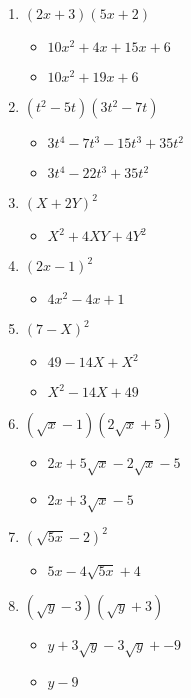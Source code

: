 \documentclass{article}
\begin{document}
\begin{onehalfspace}
\begin{enumerate}
    \item $(2x + 3)(5x + 2)$
    \begin{itemize}
        \item $10x^{2} + 4x + 15x + 6$
        \item $10x^{2} + 19x + 6$
    \end{itemize}

    \item $(t^{2} - 5t)(3t^{2} - 7t)$
    \begin{itemize}
        \item $3t^{4} - 7t^{3} - 15t^{3} + 35t^{2}$
        \item $3t^{4} - 22t^{3} + 35t^{2}$
    \end{itemize}

    \item $(X + 2Y)^{2}$
    \begin{itemize}
        \item $X^{2} + 4XY + 4Y^{2}$
    \end{itemize}

    \item $(2x - 1)^{2}$
    \begin{itemize}
        \item $4x^{2} - 4x + 1$
    \end{itemize}

    \item $(7 - X)^{2}$
    \begin{itemize}
        \item $49 - 14X + X^{2}$
        \item $X^{2} - 14X + 49$
    \end{itemize}

    \item $(\sqrt{x} - 1)(2\sqrt{x} + 5)$
    \begin{itemize}
        \item $2x + 5\sqrt{x} - 2\sqrt{x} - 5$
        \item $2x + 3\sqrt{x} - 5$
    \end{itemize}

    \item $(\sqrt{5x} - 2)^{2}$
    \begin{itemize}
        \item $5x - 4\sqrt{5x} + 4$
    \end{itemize}

    \item $(\sqrt{y} - 3)(\sqrt{y} + 3)$
    \begin{itemize}
        \item $y + 3\sqrt{y} - 3\sqrt{y} + - 9$
        \item $y - 9$
    \end{itemize}


\end{enumerate}
\end{onehalfspace}
\end{document}
